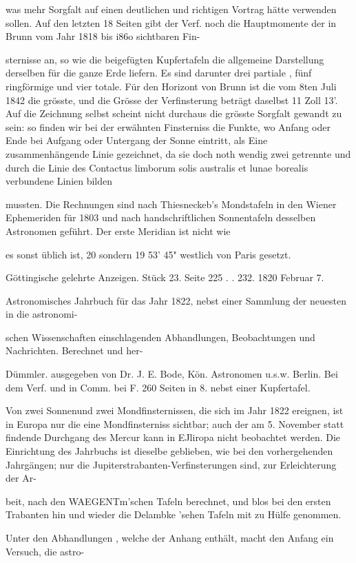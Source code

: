 \documentclass[10pt,a4paper]{article}
\begin{document}
was mehr Sorgfalt auf einen deutlichen und richtigen Vortrag hätte verwenden sollen. Auf den letzten 18 Seiten gibt der Verf. noch die Hauptmomente der in Brunn vom Jahr 1818 bis i86o sichtbaren Fin-

sternisse an, so wie die beigefügten Kupfertafeln die allgemeine Darstellung derselben für die ganze Erde liefern. Es sind darunter drei partiale , fünf ringförmige und vier totale. Für den Horizont von Brunn ist die vom 8ten Juli 1842 die grösste, und die Grösse der Verfinsterung beträgt daselbst 11 Zoll 13'. Auf die Zeichnung selbst scheint nicht durchaus die grösste Sorgfalt gewandt zu sein: so finden wir bei der erwähnten Finsterniss die Funkte, wo Anfang oder Ende bei Aufgang oder Untergang der Sonne eintritt, als Eine zusammenhängende Linie gezeichnet, da sie doch noth wendig zwei getrennte und durch die Linie des Contactus limborum solis australis et lunae borealis verbundene Linien bilden

mussten. Die Rechnungen sind nach Thiesneckeb's Mondstafeln in den Wiener Ephemeriden für 1803 und nach handschriftlichen Sonnentafeln desselben Astronomen geführt. Der erste Meridian ist nicht wie

es sonst üblich ist, 20\textdegree{} sondern 19\textdegree{} 53' 45" westlich von Paris gesetzt.

Göttingische gelehrte Anzeigen. Stück 23. Seite 225 . . 232. 1820 Februar 7.

Astronomisches Jahrbuch für das Jahr 1822, nebst einer Sammlung der neuesten in die astronomi-

schen Wissenschaften einschlagenden Abhandlungen, Beobachtungen und Nachrichten. Berechnet und her-

Dümmler. ausgegeben von Dr. J. E. Bode, Kön. Astronomen u.s.w. Berlin. Bei dem Verf. und in Comm. bei F. 260 Seiten in 8. nebst einer Kupfertafel.

Von zwei Sonnenund zwei Mondfinsternissen, die sich im Jahr 1822 ereignen, ist in Europa nur die eine Mondfinsterniss sichtbar; auch der am 5. November statt findende Durchgang des Mercur kann in EJliropa nicht beobachtet werden. Die Einrichtung des Jahrbuchs ist dieselbe geblieben, wie bei den vorhergehenden Jahrgängen; nur die Jupiterstrabanten-Verfinsterungen sind, zur Erleichterung der Ar-

beit, nach den WAEGENTm'schen Tafeln berechnet, und blos bei den ersten Trabanten hin und wieder die Delambke 'sehen Tafeln mit zu Hülfe genommen.

Unter den Abhandlungen , welche der Anhang enthält, macht den Anfang ein Versuch, die astro-
\end{document}
